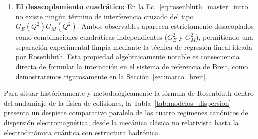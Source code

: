 \documentclass[10pt,a4paper]{article}
\begin{document}
\begin{enumerate}
    \item \textbf{El desacoplamiento cuadrático:} En la Ec.~\eqref{eq:rosenbluth_master_intro} no existe ningún término de interferencia cruzado del tipo $G_E(Q^2) G_M(Q^2)$. Ambos observables aparecen estrictamente desacoplados como combinaciones cuadráticas independientes ($G_E^2$ y $G_M^2$), permitiendo una separación experimental limpia mediante la técnica de regresión lineal ideada por Rosenbluth. Esta propiedad algebraicamente notable es consecuencia directa de formular la interacción en el sistema de referencia de Breit, como demostraremos rigurosamente en la Sección~\ref{sec:marco_breit}.
\end{enumerate}

Para situar históricamente y metodológicamente la fórmula de Rosenbluth dentro del andamiaje de la física de colisiones, la Tabla~\ref{tab:modelos_dispersion} presenta un despiece comparativo paralelo de los cuatro regímenes canónicos de dispersión electromagnética, desde la mecánica clásica no relativista hasta la electrodinámica cuántica con estructura hadrónica.
\end{document}
